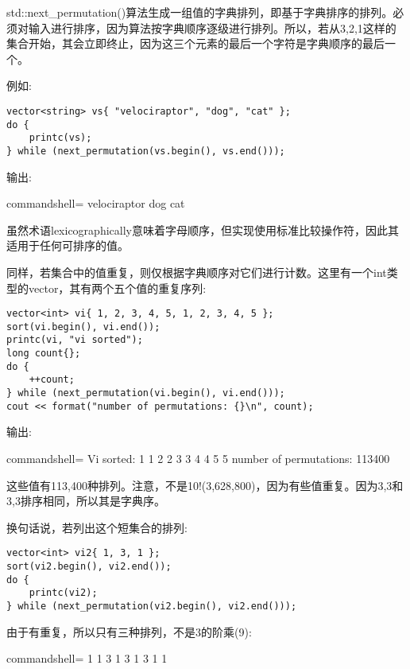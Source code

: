 std::next\_permutation()算法生成一组值的字典排列，即基于字典排序的排列。必须对输入进行排序，因为算法按字典顺序逐级进行排列。所以，若从3,2,1这样的集合开始，其会立即终止，因为这三个元素的最后一个字符是字典顺序的最后一个。

例如:

\begin{lstlisting}[style=styleCXX]
vector<string> vs{ "velociraptor", "dog", "cat" };
do {
	printc(vs);
} while (next_permutation(vs.begin(), vs.end()));
\end{lstlisting}

输出:

\begin{tcblisting}{commandshell={}}
velociraptor dog cat
\end{tcblisting}

虽然术语lexicographically意味着字母顺序，但实现使用标准比较操作符，因此其适用于任何可排序的值。

同样，若集合中的值重复，则仅根据字典顺序对它们进行计数。这里有一个int类型的vector，其有两个五个值的重复序列:

\begin{lstlisting}[style=styleCXX]
vector<int> vi{ 1, 2, 3, 4, 5, 1, 2, 3, 4, 5 };
sort(vi.begin(), vi.end());
printc(vi, "vi sorted");
long count{};
do {
	++count;
} while (next_permutation(vi.begin(), vi.end()));
cout << format("number of permutations: {}\n", count);
\end{lstlisting}

输出:

\begin{tcblisting}{commandshell={}}
Vi sorted: 1 1 2 2 3 3 4 4 5 5
number of permutations: 113400
\end{tcblisting}

这些值有113,400种排列。注意，不是10!(3,628,800)，因为有些值重复。因为3,3和3,3排序相同，所以其是字典序。

换句话说，若列出这个短集合的排列:

\begin{lstlisting}[style=styleCXX]
vector<int> vi2{ 1, 3, 1 };
sort(vi2.begin(), vi2.end());
do {
	printc(vi2);
} while (next_permutation(vi2.begin(), vi2.end()));
\end{lstlisting}

由于有重复，所以只有三种排列，不是3的阶乘(9):

\begin{tcblisting}{commandshell={}}
1 1 3
1 3 1
3 1 1
\end{tcblisting}






